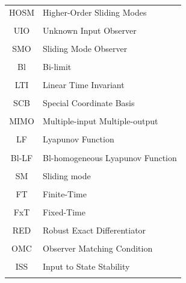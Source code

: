 \documentclass[11pt,letterpaper,twoside,openright]{report}
\begin{document}
\begin{tabular}{cl}
	HOSM	&\hspace{1.5cm} Higher-Order Sliding Modes\\\\
	UIO		&\hspace{1.5cm} Unknown Input Observer	\\\\
	SMO		&\hspace{1.5cm} Sliding Mode Observer \\\\
	Bl		&\hspace{1.5cm} Bi-limit\\\\
	LTI	   	&\hspace{1.5cm} Linear Time Invariant \\\\
	SCB	   	&\hspace{1.5cm} Special Coordinate Basis\\\\
	MIMO	&\hspace{1.5cm} Multiple-input Multiple-output\\\\
	LF		&\hspace{1.5cm} Lyapunov Function\\\\
	Bl-LF	&\hspace{1.5cm} Bl-homogeneous Lyapunov Function\\\\
	SM		&\hspace{1.5cm} Sliding mode\\\\
	FT		&\hspace{1.5cm} Finite-Time\\\\
	FxT		&\hspace{1.5cm} Fixed-Time\\\\
	RED		&\hspace{1.5cm} Robust Exact Differentiator\\\\
	OMC		&\hspace{1.5cm} Observer Matching Condition \\\\
	ISS		&\hspace{1.5cm} Input to State Stability \\\\
\end{tabular}
\end{document}
